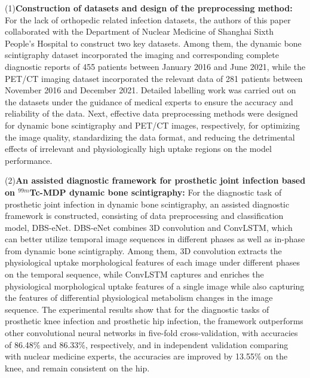 \begin{eabstract}
    (1)\textbf{Construction of datasets and design of the preprocessing method: }For the lack of orthopedic related infection datasets, the authors of this paper collaborated with the Department of Nuclear Medicine of Shanghai Sixth People's Hospital to construct two key datasets. Among them, the dynamic bone scintigraphy dataset incorporated the imaging and corresponding complete diagnostic reports of 455 patients between January 2016 and June 2021, while the PET/CT imaging dataset incorporated the relevant data of 281 patients between November 2016 and December 2021. Detailed labelling work was carried out on the datasets under the guidance of medical experts to ensure the accuracy and reliability of the data. Next, effective data preprocessing methods were designed for dynamic bone scintigraphy and PET/CT images, respectively, for optimizing the image quality, standardizing the data format, and reducing the detrimental effects of irrelevant and physiologically high uptake regions on the model performance.

    (2)\textbf{An assisted diagnostic framework for prosthetic joint infection based on \(^{99m}\)Tc-MDP dynamic bone scintigraphy: }For the diagnostic task of prosthetic joint infection in dynamic bone scintigraphy, an assisted diagnostic framework is constructed, consisting of data preprocessing and classification model, DBS-eNet. DBS-eNet combines 3D convolution and ConvLSTM, which can better utilize temporal image sequences in different phases as well as in-phase from dynamic bone scintigraphy. Among them, 3D convolution extracts the physiological uptake morphological features of each image under different phases on the temporal sequence, while ConvLSTM captures and enriches the physiological morphological uptake features of a single image while also capturing the features of differential physiological metabolism changes in the image sequence. The experimental results show that for the diagnostic tasks of prosthetic knee infection and prosthetic hip infection, the framework outperforms other convolutional neural networks in five-fold cross-validation, with accuracies of 86.48\% and 86.33\%, respectively, and in independent validation comparing with nuclear medicine experts, the accuracies are improved by 13.55\% on the knee, and remain consistent on the hip.


\end{eabstract}
